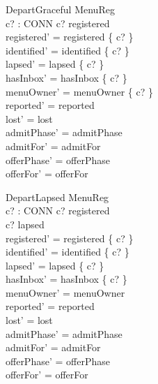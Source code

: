 \documentclass[a4paper,10pt,fleqn]{article}
\begin{document}
\begin{schema}{DepartGraceful}
  \Delta MenuReg \\
  c? : CONN
\where
  c? \in registered \\
  registered' = registered \setminus \{ c? \} \\
  identified' = identified \setminus \{ c? \} \\
  lapsed' = lapsed \setminus \{ c? \} \\
  hasInbox' = hasInbox \setminus \{ c? \} \\
  menuOwner' = menuOwner \setminus \{ c? \} \\
  reported' = reported \\
  lost' = lost \\
  admitPhase' = admitPhase \\
  admitFor' = admitFor \\
  offerPhase' = offerPhase \\
  offerFor' = offerFor
\end{schema}

\begin{schema}{DepartLapsed}
  \Delta MenuReg \\
  c? : CONN
\where
  c? \in registered \\
  c? \in lapsed \\
  registered' = registered \setminus \{ c? \} \\
  identified' = identified \setminus \{ c? \} \\
  lapsed' = lapsed \setminus \{ c? \} \\
  hasInbox' = hasInbox \setminus \{ c? \} \\
  menuOwner' = menuOwner \\
  reported' = reported \\
  lost' = lost \\
  admitPhase' = admitPhase \\
  admitFor' = admitFor \\
  offerPhase' = offerPhase \\
  offerFor' = offerFor
\end{schema}
\end{document}
